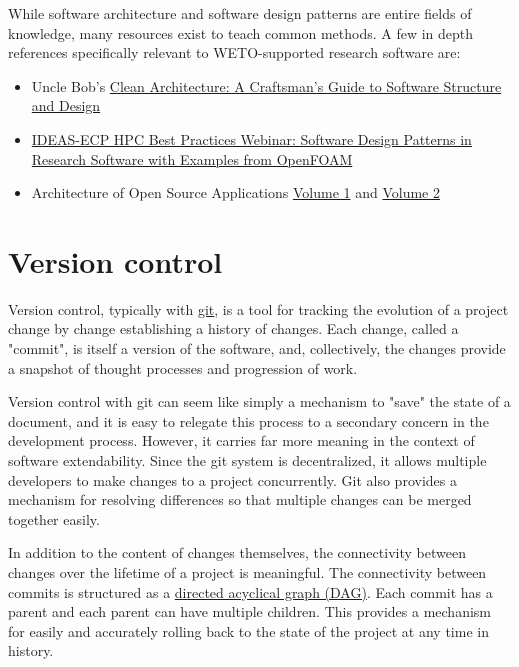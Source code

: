 \documentclass[]{nrel}
\begin{document}
While software architecture and software design patterns are entire fields of knowledge,
many resources exist to teach common methods.
A few in depth references specifically relevant to WETO-supported research software are:
\begin{itemize}    
\item Uncle Bob's \href{https://books.google.com/books/about/Clean_Architecture.html?id=uGE1DwAAQBAJ&source=kp_book_description}{Clean Architecture: A Craftsman's Guide to Software Structure and Design}
\item \href{https://www.youtube.com/watch?v=UWmkj-9SdAI}{IDEAS-ECP HPC Best Practices Webinar: Software Design Patterns in Research Software with Examples from OpenFOAM}
\item Architecture of Open Source Applications \href{https://aosabook.org/en/#aosa1}{Volume 1} and \href{https://aosabook.org/en/#aosa2}{Volume 2}
\end{itemize}


\section{Version control}
\label{sec:version_control}

Version control, typically with \href{https://git-scm.com}{git}, is a tool for tracking the
evolution of a project change by change establishing a history of changes.
Each change, called a "commit", is itself a version of the software, and, collectively,
the changes provide a snapshot of thought processes and progression of work.

Version control with git can seem like simply a mechanism to "save" the state of a document,
and it is easy to relegate this process to a secondary concern in the development process.
However, it carries far more meaning in the context of software extendability.
Since the git system is decentralized, it allows multiple developers to make changes to a
project concurrently.
Git also provides a mechanism for resolving differences so that multiple changes can be merged
together easily.

In addition to the content of changes themselves, the connectivity between changes over the
lifetime of a project is meaningful.
The connectivity between commits is structured as a
\href{https://en.wikipedia.org/wiki/Directed\_acyclic\_graph}{directed acyclical graph (DAG)}.
Each commit has a parent and each parent can have multiple children.
This provides a mechanism for easily and accurately rolling back to the state of the project at any
time in history.
\end{document}
